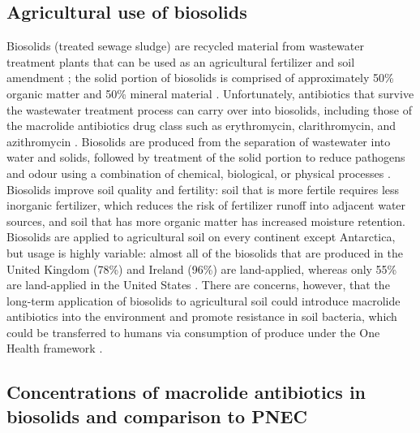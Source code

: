 \subsection{Agricultural use of biosolids}

Biosolids (treated sewage sludge) are recycled material from wastewater treatment plants that can be used as an agricultural fertilizer and soil amendment \parencite{Sharma.2017}; the solid portion of biosolids is comprised of approximately 50\% organic matter and 50\% mineral material \parencite{OntarioMinistryofAgricultureFoodandRuralAffairs.2010}.
Unfortunately, antibiotics that survive the wastewater treatment process can carry over into biosolids, including those of the macrolide antibiotics drug class such as erythromycin, clarithromycin, and azithromycin \parencite{McClellan.2010, Sabourin.2012, Chenxi.2008}.
Biosolids are produced from the separation of wastewater into water and solids, followed by treatment of the solid portion to reduce pathogens and odour using a combination of chemical, biological, or physical processes \parencite{LeMinh.2010}.
Biosolids improve soil quality and fertility:
soil that is more fertile requires less inorganic fertilizer, which reduces the risk of fertilizer runoff into adjacent water sources, and soil that has more organic matter has increased moisture retention.
Biosolids are applied to agricultural soil on every continent except Antarctica, but usage is highly variable:
almost all of the biosolids that are produced in the United Kingdom (78\%) and Ireland (96\%) are land-applied, whereas only 55\% are land-applied in the United States \parencite{Sharma.2017}.
There are concerns, however, that the long-term application of biosolids to agricultural soil could introduce macrolide antibiotics into the environment and promote resistance in soil bacteria, which could be transferred to humans via consumption of produce under the One Health framework \parencite{Lau.2020, Sabourin.2012}.

\subsection{Concentrations of macrolide antibiotics in biosolids and comparison to PNEC}

